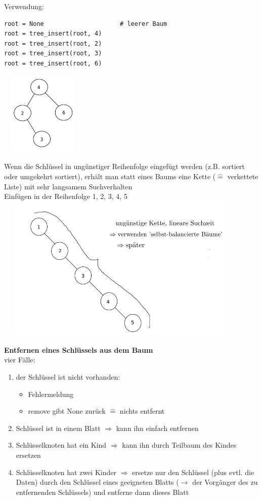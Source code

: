 Verwendung:
\begin{verbatim}
root = None                     # leerer Baum
root = tree_insert(root, 4)
root = tree_insert(root, 2)
root = tree_insert(root, 3)
root = tree_insert(root, 6)
\end{verbatim}

\includegraphics[width=4cm,height=4cm,keepaspectratio]{./Pictures/zahlenbaum.png}

Wenn die Schlüssel in ungünstiger Reihenfolge eingefügt werden (z.B. sortiert oder umgekehrt sortiert), erhält man statt eines Baums eine Kette ($\widehat{=}$ verkettete Liste) mit sehr langsamem Suchverhalten \\

Einfügen in der Reihenfolge 1, 2, 3, 4, 5 \\

\includegraphics[width=12cm,height=7cm,keepaspectratio]{./Pictures/Kette.png}

\textbf{Entfernen eines Schlüssels aus dem Baum}\\
vier Fälle:
\begin{enumerate}
    \item der Schlüssel ist nicht vorhanden:
    \begin{itemize}
        \item Fehlermeldung
        \item remove gibt None zurück $\widehat{=}$ nichts entfernt
    \end{itemize}
    \item Schlüssel ist in einem Blatt $\Rightarrow$ kann ihn einfach entfernen
    \item Schlüsselknoten hat ein Kind $\Rightarrow$ kann ihn durch Teilbaum des Kindes ersetzen
    \item Schlüsselknoten hat zwei Kinder $\Rightarrow$ ersetze nur den Schlüssel (plus evtl. die Daten) durch den Schlüssel eines geeigneten Blatts ($\rightarrow$ der Vorgänger des zu entfernenden Schlüssels)  und entferne dann dieses Blatt
\end{enumerate}

